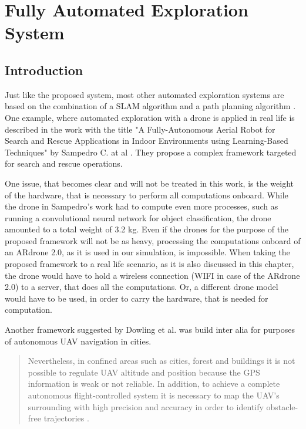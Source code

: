 \chapter{Fully Automated Exploration System}

\section{Introduction}

	Just like the proposed system, most other automated exploration systems are based on the combination of a SLAM algorithm and 
	a path planning algorithm \cite{aut1} \cite{deep} \cite{accurat} \cite{aut2}. One example, where automated exploration with a drone is 
	applied in real life is described in the work with the title "A Fully-Autonomous Aerial Robot for Search and Rescue Applications
in Indoor Environments using Learning-Based Techniques" by Sampedro C. at al \cite{aut1}. They propose a complex framework targeted for search and 
    rescue operations. 
	
	One issue, that becomes clear and will not be treated in this work, is the weight of the hardware, that is necessary to perform all computations 
	onboard. While the drone in Sampedro's work had to compute even more processes, such as running a convolutional neural network for object classification, 
	the drone amounted to a total weight of 3.2 kg. Even if the drones for the purpose of the proposed framework will not be as heavy, processing the computations onboard of an ARdrone 2.0, as 
	it is used in our simulation, is impossible. When taking the proposed framework to a real life scenario, as it is also discussed in this chapter, 
	the drone would have to hold a wireless connection (WIFI in case of the ARdrone 2.0) to a server, that does all the computations. Or, a different drone model
	would have to be used, in order 
	to carry the hardware, that is needed for computation. 
	
	Another framework suggested by Dowling et al. was build inter alia for purposes of autonomous UAV navigation in cities. 
	
	\begin{quote}
	
	Nevertheless, in confined areas such as cities,
	forest and buildings it is not possible to regulate UAV altitude
	and position because the GPS information is weak or not
	reliable. In addition, to achieve a complete autonomous
	flight-controlled system it is necessary to map the UAV’s
	surrounding with high precision and accuracy in order to
	identify obstacle-free trajectories \cite{int1}.
	
	\end{quote}
	
